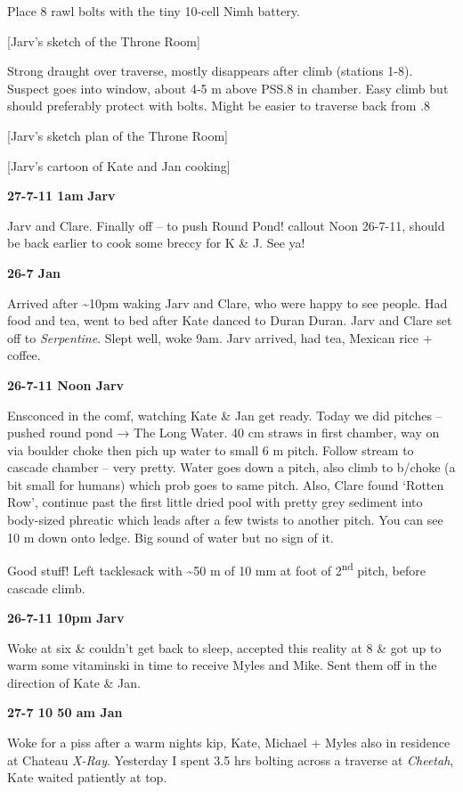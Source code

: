 Place 8 rawl bolts with the tiny 10-cell Nimh battery.

{[}Jarv's sketch of the Throne Room{]}

Strong draught over traverse, mostly disappears after climb (stations
1-8). Suspect goes into window, about 4-5 m above PSS.8 in chamber. Easy
climb but should preferably protect with bolts. Might be easier to
traverse back from .8

{[}Jarv's sketch plan of the Throne Room{]}

{[}Jarv's cartoon of Kate and Jan cooking{]}

\textbf{27-7-11 1am} \textbf{Jarv}

Jarv and Clare. Finally off -- to push Round Pond! callout Noon 26-7-11,
should be back earlier to cook some breccy for K \& J. See ya!

\textbf{26-7 Jan}

Arrived after \textasciitilde 10pm waking Jarv and Clare, who were happy
to see people. Had food and tea, went to bed after Kate danced to Duran
Duran. Jarv and Clare set off to \emph{Serpentine}. Slept well, woke
9am. Jarv arrived, had tea, Mexican rice + coffee.

\textbf{26-7-11 Noon Jarv}

Ensconced in the comf, watching Kate \& Jan get ready. Today we did
pitches -- pushed round pond → The Long Water. 40 cm straws in first
chamber, way on via boulder choke then pich up water to small 6 m pitch.
Follow stream to cascade chamber -- very pretty. Water goes down a
pitch, also climb to b/choke (a bit small for humans) which prob goes to
same pitch. Also, Clare found `Rotten Row', continue past the first
little dried pool with pretty grey sediment into body-sized phreatic
which leads after a few twists to another pitch. You can see 10 m down
onto ledge. Big sound of water but no sign of it.

Good stuff! Left tacklesack with \textasciitilde 50 m of 10 mm at foot
of 2\textsuperscript{nd} pitch, before cascade climb.

\textbf{26-7-11 10pm Jarv}

Woke at six \& couldn't get back to sleep, accepted this reality at 8 \&
got up to warm some vitaminski in time to receive Myles and Mike. Sent
them off in the direction of Kate \& Jan.

\textbf{27-7 10 50 am Jan}

Woke for a piss after a warm nights kip, Kate, Michael + Myles also in
residence at Chateau \emph{X-Ray}. Yesterday I spent 3.5 hrs bolting
across a traverse at \emph{Cheetah}, Kate waited patiently at top.

